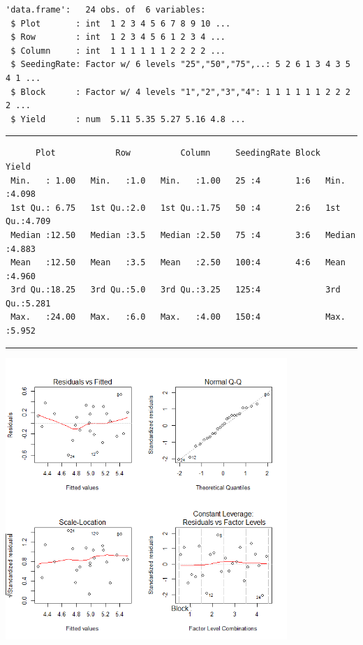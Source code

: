 \documentclass[a4paper, 10pt, fleqn, twosided]{memoir}
\begin{document}
\begin{tcolorbox}[title = Exercise 4 output continued]
\begin{verbatim}
'data.frame':   24 obs. of  6 variables:
 $ Plot       : int  1 2 3 4 5 6 7 8 9 10 ...
 $ Row        : int  1 2 3 4 5 6 1 2 3 4 ...
 $ Column     : int  1 1 1 1 1 1 2 2 2 2 ...
 $ SeedingRate: Factor w/ 6 levels "25","50","75",..: 5 2 6 1 3 4 3 5 4 1 ...
 $ Block      : Factor w/ 4 levels "1","2","3","4": 1 1 1 1 1 1 2 2 2 2 ...
 $ Yield      : num  5.11 5.35 5.27 5.16 4.8 ...
\end{verbatim}
{\color{outpt} {\hrule height 1pt}}
\begin{verbatim}
      Plot            Row          Column     SeedingRate Block     Yield
 Min.   : 1.00   Min.   :1.0   Min.   :1.00   25 :4       1:6   Min.   :4.098
 1st Qu.: 6.75   1st Qu.:2.0   1st Qu.:1.75   50 :4       2:6   1st Qu.:4.709
 Median :12.50   Median :3.5   Median :2.50   75 :4       3:6   Median :4.883
 Mean   :12.50   Mean   :3.5   Mean   :2.50   100:4       4:6   Mean   :4.960
 3rd Qu.:18.25   3rd Qu.:5.0   3rd Qu.:3.25   125:4             3rd Qu.:5.281
 Max.   :24.00   Max.   :6.0   Max.   :4.00   150:4             Max.   :5.952
\end{verbatim}
{\color{outpt} {\hrule height 1pt}}
\vspace{0.2cm}

\includegraphics[width=0.8\textwidth, frame]{Exercise4Resplot.png}
\end{tcolorbox}
\end{document}
